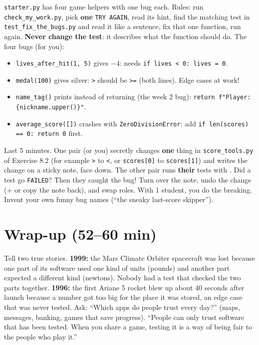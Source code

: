 \begin{bughunt}
\texttt{starter.py} has four game helpers with one bug each. Rules: run \texttt{check\_my\_work.py}, pick \textbf{one} \texttt{TRY AGAIN}, read its hint,
find the matching test in \texttt{test\_fix\_the\_bugs.py} and read it like a sentence, fix that one function, run again. \textbf{Never change the test}:
it describes what the function should do. The four bugs (for you):
\begin{itemize}[leftmargin=1.2em]
  \item \texttt{lives\_after\_hit(1, 5)} gives $-4$: needs \texttt{if lives < 0: lives = 0}.
  \item \texttt{medal(100)} gives silver: \texttt{>} should be \texttt{>=} (both lines). Edge cases at work!
  \item \texttt{name\_tag()} prints instead of returning (the week 2 bug): \texttt{return f"Player: \{nickname.upper()\}"}.
  \item \texttt{average\_score([])} crashes with \texttt{ZeroDivisionError}: add \texttt{if len(scores) == 0: return 0} first.
\end{itemize}
\end{bughunt}

\begin{freebuild}
Last 5 minutes. One pair (or you) secretly changes \textbf{one} thing in \texttt{score\_tools.py} of Exercise 8.2 (for example \texttt{>} to \texttt{<}, or
\texttt{scores[0]} to \texttt{scores[1]}) and writes the change on a sticky note, face down. The other pair runs \textbf{their} tests with .
Did a test go \texttt{FAILED}? Then they caught the bug! Turn over the note, undo the change (+ or copy the note back), and swap roles.
With 1 student, you do the breaking. Invent your own funny bug names (\enquote{the sneaky last-score skipper}).
\end{freebuild}

\section{Wrap-up (52--60 min)}
\begin{safety}
Tell two true stories. \textbf{1999:} the Mars Climate Orbiter spacecraft was lost because one part of its software used one kind of units
(pounds) and another part expected a different kind (newtons). Nobody had a test that checked the two parts together.
\textbf{1996:} the first Ariane 5 rocket blew up about 40 seconds after launch because a number got too big for the place it was stored, an edge case that was never tested.
Ask: \enquote{Which apps do people trust every day?} (maps, messages, banking, games that save progress). \enquote{People can only trust software that has been
tested. When you share a game, testing it is a way of being fair to the people who play it.}
\end{safety}

